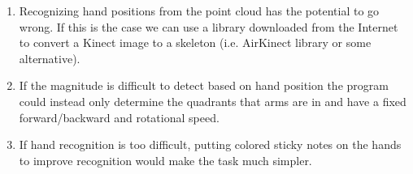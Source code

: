 \documentclass[a4paper]{article}
\begin{document}
\begin{enumerate}
\item Recognizing hand positions from the point cloud has the potential to go wrong. If this is the case we can use a library downloaded from the Internet to convert a Kinect image to a skeleton (i.e. AirKinect library or some alternative).
\item If the magnitude is difficult to detect based on hand position the program could instead only determine the quadrants that arms are in and have a fixed forward/backward and rotational speed.
\item If hand recognition is too difficult, putting colored sticky notes on the hands to improve recognition would make the task much simpler.
\end{enumerate}
\end{document}
